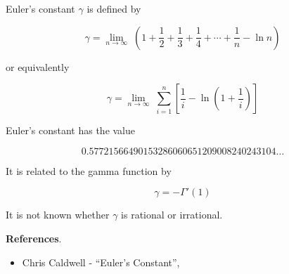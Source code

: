 \documentclass{article}
\begin{document}
Euler's constant $\gamma$ is defined by 

$$ \gamma = \lim_{n\rightarrow \infty}\; \left(1 + \frac{1}{2} + \frac{1}{3} + \frac{1}{4} + \cdots + \frac{1}{n} - \ln {n}\right) $$

or equivalently

$$ \gamma = \lim_{n\rightarrow \infty}\; \sum_{i=1}^n \left[\frac{1}{i} - \ln \left( 1 + \frac{1}{i} \right) \right] $$

Euler's constant has the value

$$ 0.57721566490153286060651209008240243104\ldots $$

It is related to the gamma function by

$$ \gamma = - \Gamma'(1) $$

It is not known whether $\gamma$ is rational or irrational.

{\bf References}.

\begin{itemize}

\item  Chris Caldwell - ``Euler's Constant'', 

\end{itemize}
\end{document}

